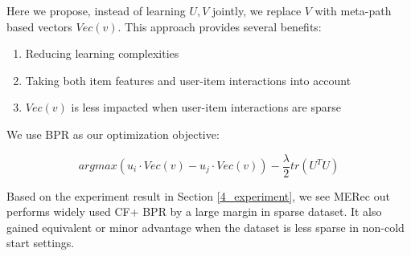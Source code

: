 Here we propose, instead of learning $U, V$ jointly, we replace $V$ with meta-path based vectors $Vec(v)$. This approach provides several benefits:
\begin{enumerate}
        \item Reducing learning complexities
        \item Taking both item features and user-item interactions into account
        \item $Vec(v)$ is less impacted when user-item interactions are sparse 
\end{enumerate}

We use BPR as our optimization objective:

\begin{equation}\label{skipgram}
    arg max (u_i \cdot Vec(v)-u_j \cdot Vec(v)) - \dfrac{\lambda}{2}tr(U^TU)
\end{equation}


Based on the experiment result in Section \ref{4_experiment}, we see MERec out performs widely used CF+ BPR by a large margin in sparse dataset. It also gained equivalent or minor advantage when the dataset is less sparse in non-cold start settings.



